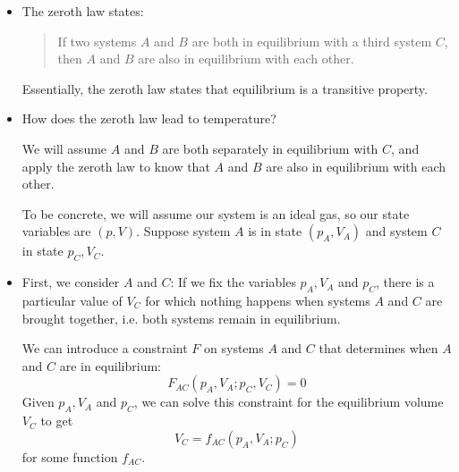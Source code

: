 \documentclass[11pt, a4paper]{article}
\begin{document}
\begin{itemize}
	\item The zeroth law states:
	\begin{quote}
		If two systems $ A $ and $ B $ are both in equilibrium with a third system $ C $, then $ A $ and $ B $ are also in equilibrium with each other.
	\end{quote}
	Essentially, the zeroth law states that equilibrium is a transitive property.
	
	\item  How does the zeroth law lead to temperature? 
	
	We will assume $ A $ and $ B $ are both separately in equilibrium with $ C $, and apply the zeroth law to know that $ A $ and $ B $ are also in equilibrium with each other.
	
	To be concrete, we will assume our system is an ideal gas, so our state variables are $ (p, V) $. Suppose system $ A $ is in state $ (p_{A}, V_{A}) $ and system $ C $ in state $ p_{C}, V_{C} $.
	
	\item First, we consider $ A $ and $ C $: If we fix the variables $ p_{A}, V_{A} $ and $ p_{C} $, there is a particular value of $ V_{C} $ for which nothing happens when systems $ A $ and $ C $ are brought together, i.e. both systems remain in equilibrium. 
	
	We can introduce a constraint $ F $ on systems $ A $ and $ C $ that determines when $ A $ and $ C $ are in equilibrium:
	\begin{equation*}
		F_{AC}(p_{A}, V_{A}; p_{C}, V_{C}) = 0
	\end{equation*}
	Given $ p_{A}, V_{A} $ and $ p_{C} $, we can solve this constraint for the equilibrium volume $ V_{C} $ to get
	\begin{equation*}
		V_{C} = f_{AC}(p_{A}, V_{A}; p_{C})
	\end{equation*} for some function $ f_{AC} $.
	

\end{itemize}
\end{document}
